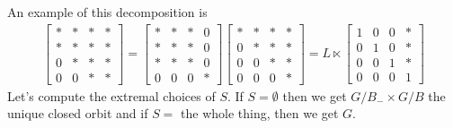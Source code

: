 \documentclass[12pt]{article}
\begin{document}
An example of this decomposition is \begin{align*}
	\begin{bmatrix}
		* & * & * & * \\
		* & * & * & * \\
		0 & * & * & * \\
		0 & 0 & * & *
	\end{bmatrix} = \begin{bmatrix}
		                * & * & * & 0 \\
		                * & * & * & 0 \\
		                * & * & * & 0 \\
		                0 & 0 & 0 & *
	                \end{bmatrix} \begin{bmatrix}
		                              * & * & * & * \\
		                              0 & * & * & * \\
		                              0 & 0 & * & * \\
		                              0 & 0 & 0 & *
	                              \end{bmatrix} = L \ltimes \begin{bmatrix}
		                                                        1 & 0 & 0 & * \\
		                                                        0 & 1 & 0 & * \\
		                                                        0 & 0 & 1 & * \\
		                                                        0 & 0 & 0 & 1
	                                                        \end{bmatrix}
\end{align*} Let's compute the extremal choices of $S$. If $S = \emptyset$ then we get $G/B_- \times G/B$ the unique closed
orbit and if $S = $ the whole thing, then we get $G$.
\end{document}
